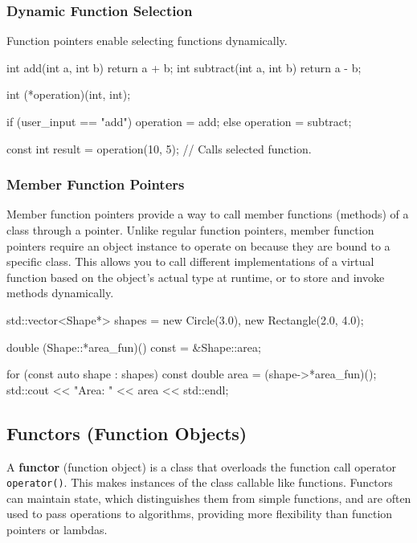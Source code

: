 \subsubsection{Dynamic Function Selection}

Function pointers enable selecting functions dynamically.

\begin{codeblock}[language=C++, numbers=none]
int add(int a, int b) { return a + b; }
int subtract(int a, int b) { return a - b; }

int (*operation)(int, int);

if (user_input == "add") {
    operation = add;
} else {
    operation = subtract;
}

const int result = operation(10, 5); // Calls selected function.
\end{codeblock}

\subsubsection{Member Function Pointers}

Member function pointers provide a way to call member functions (methods) of a class through a pointer. Unlike regular function pointers, member function pointers require an object instance to operate on because they are bound to a specific class. This allows you to call different implementations of a virtual function based on the object's actual type at runtime, or to store and invoke methods dynamically.

\begin{codeblock}[language=C++, numbers=none]
std::vector<Shape*> shapes = {new Circle(3.0), new Rectangle(2.0, 4.0)};

double (Shape::*area_fun)() const = &Shape::area;

for (const auto shape : shapes) {
    const double area = (shape->*area_fun)();
    std::cout << "Area: " << area << std::endl;
}
\end{codeblock}

\subsection{Functors (Function Objects)}

A \textbf{functor} (function object) is a class that overloads the function call operator \texttt{operator()}. This makes instances of the class callable like functions. Functors can maintain state, which distinguishes them from simple functions, and are often used to pass operations to algorithms, providing more flexibility than function pointers or lambdas.

